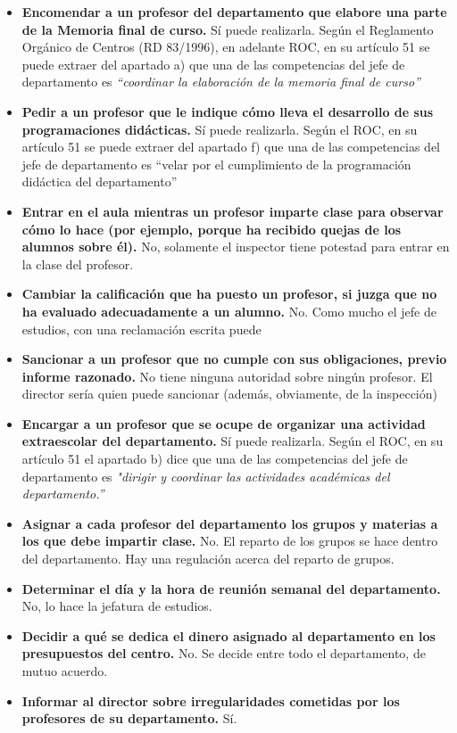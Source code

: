 \begin{itemize}

	\item \textbf{Encomendar a un profesor del departamento que elabore una parte de la Memoria final de curso.}
	Sí puede realizarla. 
	Según el Reglamento Orgánico de Centros (RD 83/1996), en adelante ROC, en su artículo 51 se puede extraer del apartado a) que una de las competencias del jefe de departamento es \textit{“coordinar la elaboración de la memoria final de curso”}

	\item \textbf{Pedir a un profesor que le indique cómo lleva el desarrollo de sus programaciones didácticas.}
	Sí puede realizarla.
	Según el ROC, en su artículo 51 se puede extraer del apartado f) que una de las competencias del jefe de departamento es “velar por el cumplimiento de la programación didáctica del departamento”
	\item \textbf{Entrar en el aula mientras un profesor imparte clase para observar cómo lo hace (por ejemplo, porque ha recibido quejas de los alumnos sobre él).}
	No, solamente el inspector tiene potestad para entrar en la clase del profesor.
	\item \textbf{Cambiar la calificación que ha puesto un profesor, si juzga que no ha evaluado adecuadamente a un alumno.}
	No. Como mucho el jefe de estudios, con una reclamación escrita puede
	\item \textbf{Sancionar a un profesor que no cumple con sus obligaciones, previo informe razonado.}
	No tiene ninguna autoridad sobre ningún profesor. 
	El director sería quien puede sancionar (además, obviamente, de la inspección)
	\item \textbf{Encargar a un profesor que se ocupe de organizar una actividad extraescolar del departamento.}
	Sí puede realizarla.
	Según el ROC, en su artículo 51 el apartado b) dice que una de las competencias del jefe de departamento es \textit{"dirigir y coordinar las actividades académicas del departamento.”}
	\item \textbf{Asignar a cada profesor del departamento los grupos y materias a los que debe impartir clase.}
	No. El reparto de los grupos se hace dentro del departamento. Hay una regulación acerca del reparto de grupos.
	\item \textbf{Determinar el día y la hora de reunión semanal del departamento.}
	No, lo hace la jefatura de estudios. 
	\item \textbf{Decidir a qué se dedica el dinero asignado al departamento en los presupuestos del centro.}
	No. Se decide entre todo el departamento, de mutuo acuerdo.
	\item \textbf{Informar al director sobre irregularidades cometidas por los profesores de su departamento.}
	Sí.
\end{itemize}

